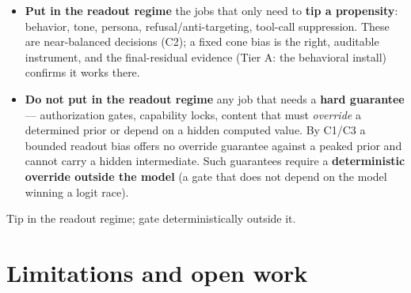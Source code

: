 \documentclass[11pt]{article}
\theoremstyle{plain}
\theoremstyle{definition}
\begin{document}
\begin{itemize}
\item \textbf{Put in the readout regime} the jobs that only need to \textbf{tip a propensity}: behavior, tone, persona, refusal/anti-targeting, tool-call suppression. These are near-balanced decisions (C2); a fixed cone bias is the right, auditable instrument, and the final-residual evidence (Tier A: the behavioral install) confirms it works there.
\item \textbf{Do not put in the readout regime} any job that needs a \textbf{hard guarantee} --- authorization gates, capability locks, content that must \emph{override} a determined prior or depend on a hidden computed value. By C1/C3 a bounded readout bias offers no override guarantee against a peaked prior and cannot carry a hidden intermediate. Such guarantees require a \textbf{deterministic override outside the model} (a gate that does not depend on the model winning a logit race).
\end{itemize}

Tip in the readout regime; gate deterministically outside it.

\section{Limitations and open work}
\end{document}
